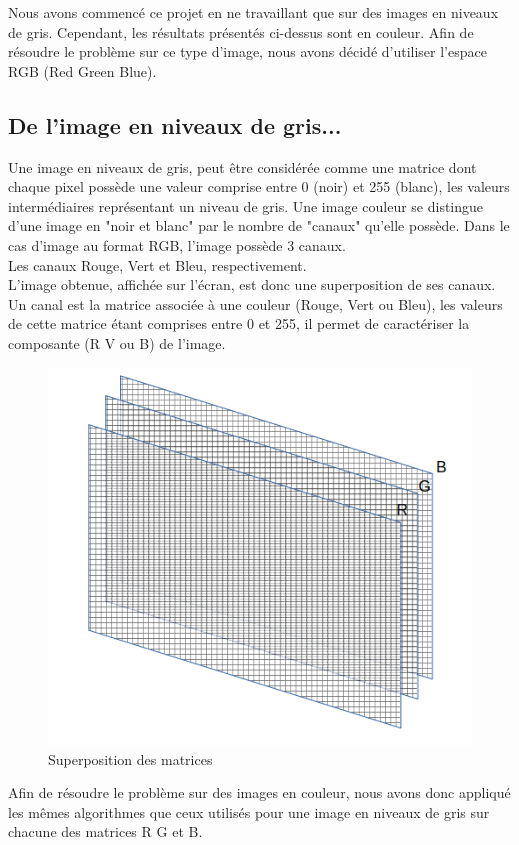 Nous avons commencé ce projet en ne travaillant que sur des images en niveaux de gris. Cependant, les résultats présentés ci-dessus sont en couleur. Afin de résoudre le problème sur ce type d'image, nous avons décidé d'utiliser l'espace RGB (Red Green Blue).
\subsection{De l'image en niveaux de gris...}
Une image  en niveaux de gris, peut être considérée comme une matrice dont chaque pixel possède une valeur comprise entre 0 (noir) et 255 (blanc), les valeurs intermédiaires représentant un niveau de gris. Une image couleur se distingue d'une image en "noir et blanc" par le nombre de "canaux" qu'elle possède. Dans le cas d'image au format RGB, l'image possède 3 canaux.\\ Les canaux Rouge, Vert et Bleu, respectivement.\\
L'image obtenue, affichée sur l'écran, est donc une superposition de ses canaux.
 Un canal est la matrice associée à une couleur (Rouge, Vert ou Bleu), les valeurs de cette matrice étant comprises entre 0 et 255, il permet de caractériser la composante (R V ou B) de l'image. \\ 
 \begin{figure}[H]
 \centering
 \includegraphics[scale=0.2]{Images/rgb.png}
 \caption{Superposition des matrices}
 \end{figure}
Afin de résoudre le problème sur des images en couleur, nous avons donc appliqué les mêmes algorithmes que ceux utilisés pour une image en niveaux de gris sur chacune des matrices R G et B.
